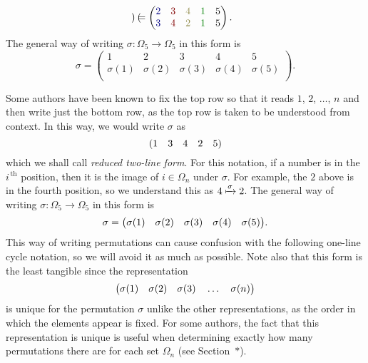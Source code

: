 \begin{example}
\[\begin{pmatrix}
    \end{pmatrix} = \begin{pmatrix}
        \textcolor{blue!50!black}{2} & \textcolor{red!50!black}{3} & \textcolor{yellow!50!black}{4} & \textcolor{green!50!black}{1} & 5 \\
        \textcolor{blue!50!black}{3} & \textcolor{red!50!black}{4} & \textcolor{yellow!50!black}{2} & \textcolor{green!50!black}{1} & 5 \\
    \end{pmatrix}.
    \]
    The general way of writing $\sigma : \Omega_{5} \to \Omega_{5}$ in this form is
    \[
    \sigma = \begin{pmatrix}
        1         & 2         & 3         & 4         & 5 \\
        \sigma(1) & \sigma(2) & \sigma(3) & \sigma(4) & \sigma(5) \\
    \end{pmatrix}.
    \]

    Some authors have been known to fix the top row so that it reads $1$, $2$, $\ldots$, $n$ and then write just the bottom row, as the top row is taken to be understood from context. In this way, we would write $\sigma$ as
    \[
    (1 \quad 3 \quad 4 \quad 2 \quad 5)
    \]
    which we shall call \textit{reduced two-line form}. For this notation, if a number is in the $i^{\,\text{th}}$ position, then it is the image of $i \in \Omega_{n}$ under $\sigma$. For example, the $2$ above is in the fourth position, so we understand this as $4 \xmapsto{\sigma} 2$. The general way of writing $\sigma : \Omega_{5} \to \Omega_{5}$ in this form is
    \[
    \sigma = \big(\sigma(1) \quad \sigma(2) \quad \sigma(3) \quad \sigma(4) \quad \sigma(5)\big).
    \]
    This way of writing permutations can cause confusion with the following one-line cycle notation, so we will avoid it as much as possible. Note also that this form is the least tangible since the representation
    \[
    \big(\sigma(1) \quad \sigma(2) \quad \sigma(3) \quad \ldots \quad \sigma(n)\big)
    \]
    is unique for the permutation $\sigma$ unlike the other representations, as the order in which the elements appear is fixed. For some authors, the fact that this representation is unique is useful when determining exactly how many permutations there are for each set $\Omega_{n}$ (see Section~$*$).


\end{example}
